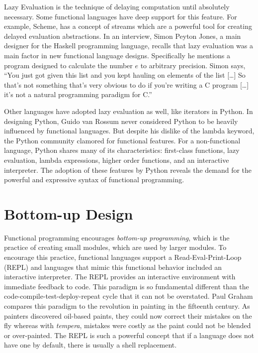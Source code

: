 \documentclass[prodmode]{acmlarge}
\begin{document}
Lazy Evaluation is the technique of delaying computation until
absolutely necessary.  Some functional languages have deep support for
this feature.  For example, Scheme, has a concept of streams which are
a powerful tool for creating delayed evaluation
abstractions\cite{Abelson1996}.  In an interview, Simon Peyton Jones,
a main designer for the Haskell programming language, recalls that
lazy evaluation was a main factor in new functional language
designs\cite{Seibel2009}.  Specifically he mentions a program designed
to calculate the number $e$ to arbitrary precision.  Simon says, ``You
just got given this list and you kept hauling on elements of the list
[\ldots] So that's not something that's very obvious to do if you're
writing a C program [\ldots] it's not a natural programming paradigm
for C.''

Other languages have adopted lazy evaluation as well, like iterators
in Python.  In designing Python, Guido van Rossum never considered
Python to be heavily influenced by functional
languages\cite{Guido2009}.  But despite his dislike of the lambda
keyword, the Python community clamored for functional features.  For a
non-functional language, Python shares many of its characteristics:
first-class functions, lazy evaluation, lambda expressions, higher
order functions, and an interactive interpreter.  The adoption of
these features by Python reveals the demand for the powerful and
expressive syntax of functional programming.

\section{Bottom-up Design}

Functional programming encourages \emph{bottom-up programming}, which
is the practice of creating small modules, which are used by larger
modules.  To encourage this practice, functional languages support a
Read-Eval-Print-Loop (REPL) and languages that mimic this functional
behavior included an interactive interpreter.  The REPL provides an
interactive environment with immediate feedback to code.  This
paradigm is so fundamental different than the
code-compile-test-deploy-repeat cycle that it can not be overstated.
Paul Graham compares this paradigm to the revolution in painting in
the fifteenth century.  As painters discovered oil-based paints, they
could now correct their mistakes on the fly whereas with
\emph{tempera}, mistakes were costly as the paint could not be blended
or over-painted\cite{Graham:1995:ACL:229872}.  The REPL is such a
powerful concept that if a language does not have one by default,
there is usually a shell replacement\cite{REPL}.
\end{document}
